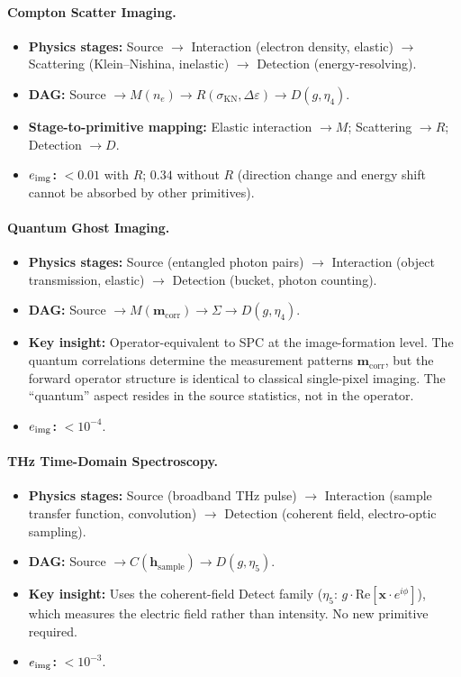 \paragraph{Compton Scatter Imaging.}
\begin{itemize}
  \item \textbf{Physics stages:} Source $\to$ Interaction (electron density, elastic) $\to$ Scattering (Klein--Nishina, inelastic) $\to$ Detection (energy-resolving).
  \item \textbf{DAG:} Source $\to M(n_e) \to R(\sigma_{\mathrm{KN}}, \Delta\varepsilon) \to D(g, \eta_4)$.
  \item \textbf{Stage-to-primitive mapping:} Elastic interaction $\to M$; Scattering $\to R$; Detection $\to D$.
  \item \textbf{$e_{\mathrm{img}}$:} $< 0.01$ with $R$; $0.34$ without $R$ (direction change and energy shift cannot be absorbed by other primitives).
\end{itemize}

\paragraph{Quantum Ghost Imaging.}
\begin{itemize}
  \item \textbf{Physics stages:} Source (entangled photon pairs) $\to$ Interaction (object transmission, elastic) $\to$ Detection (bucket, photon counting).
  \item \textbf{DAG:} Source $\to M(\mathbf{m}_{\mathrm{corr}}) \to \Sigma \to D(g, \eta_4)$.
  \item \textbf{Key insight:} Operator-equivalent to SPC at the image-formation level. The quantum correlations determine the measurement patterns $\mathbf{m}_{\mathrm{corr}}$, but the forward operator structure is identical to classical single-pixel imaging. The ``quantum'' aspect resides in the source statistics, not in the operator.
  \item \textbf{$e_{\mathrm{img}}$:} $< 10^{-4}$.
\end{itemize}

\paragraph{THz Time-Domain Spectroscopy.}
\begin{itemize}
  \item \textbf{Physics stages:} Source (broadband THz pulse) $\to$ Interaction (sample transfer function, convolution) $\to$ Detection (coherent field, electro-optic sampling).
  \item \textbf{DAG:} Source $\to C(\mathbf{h}_{\mathrm{sample}}) \to D(g, \eta_5)$.
  \item \textbf{Key insight:} Uses the coherent-field Detect family ($\eta_5$: $g \cdot \mathrm{Re}[\mathbf{x} \cdot e^{i\phi}]$), which measures the electric field rather than intensity. No new primitive required.
  \item \textbf{$e_{\mathrm{img}}$:} $< 10^{-3}$.
\end{itemize}

